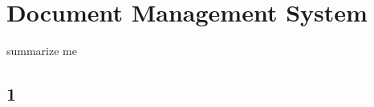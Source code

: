 \chapter{Document Management System}
\label{sec:docmanagsystem}

\begin{summary}
summarize me
\end{summary}

\section{1}
\label{sec:docmanagsystem:1}
